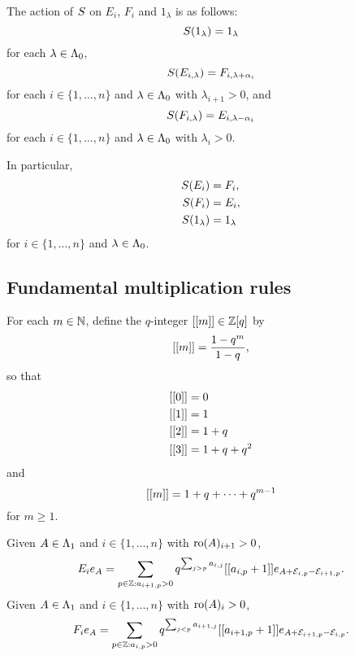\documentclass[a4paper, 11pt]{report}
\begin{document}
The action of $S{}$ on $E_i$, $F_i$ and $1_\lambda$ is as follows:
\begin{equation*}
S{(1_\lambda)} = 1_\lambda
\end{equation*}
for each $\lambda\in\Lambda_0{}$,
\begin{equation*}
S{(E_{i,\lambda})} = F_{i,\lambda+\alpha_i}
\end{equation*}
for each $i\in\{1,\ldots,n\}$ and $\lambda\in\Lambda_0{}$ with $\lambda_{i+1}>0$, and
\begin{equation*}
S{(F_{i,\lambda})} = E_{i,\lambda -\alpha_i}
\end{equation*}
for each $i\in\{1,\ldots,n\}$ and $\lambda\in\Lambda_0{}$ with $\lambda_i>0$.

In particular,
\begin{align*}
S{(E_i)} &= F_i,\\
S{(F_i)} &= E_i,\\
S{(1_\lambda)} &= 1_\lambda
\end{align*}
for $i\in\{1,\ldots,n\}$ and $\lambda\in\Lambda_0{}$.


\subsection{Fundamental multiplication rules}

For each $m\in\mathbb{N}$, define the $q$-integer $[[m]]\in\mathbb{Z}[q]$ by
\begin{equation*}
[[m]] = \frac{1-q^m}{1-q},
\end{equation*}
so that
\begin{align*}
\qint{0} &= 0\\
\qint{1} &= 1\\
\qint{2} &= 1+q\\
\qint{3} &= 1+q+q^2
\end{align*}
and
\begin{equation*}
[[m]] = 1+q+\cdots +q^{m-1}
\end{equation*}
for $m\geq 1$.

\begin{lemma}\label{lemma:fundamental-multiplication-rule}
Given $A\in\Lambda_1{}$ and $i\in\{1,\ldots,n\}$ with $\operatorname{ro}(A)_{i+1}>0$,
\begin{equation*}
E_ie_A = \sum_{p\in\mathbb{Z}:a_{i+1,p}>0} q^{\sum_{j>p}a_{i,j}} [[a_{i,p}+1]] e_{A+\mathcal{E}_{i,p} -\mathcal{E}_{i+1,p}}.
\end{equation*}
Given $A\in\Lambda_1{}$ and $i\in\{1,\ldots,n\}$ with $\operatorname{ro}(A)_i>0$,
\begin{equation*}
F_ie_A = \sum_{p\in\mathbb{Z}:a_{i,p}>0} q^{\sum_{j<p}a_{i+1,j}} [[a_{i+1,p}+1]] e_{A+\mathcal{E}_{i+1,p} -\mathcal{E}_{i,p}}.
\end{equation*}
\end{lemma}
\end{document}
